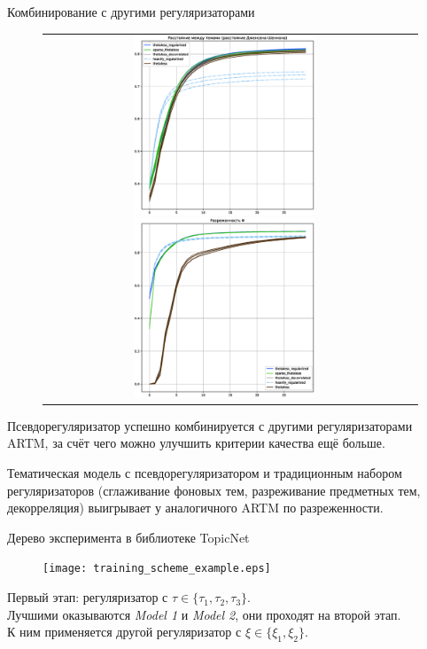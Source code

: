 \begin{frame}{Комбинирование с другими регуляризаторами}

\begin{figure}[t]
\setlength\tabcolsep{0pt} %
\begin{tabular}{cc}
\includegraphics[width=54mm]{images/CH4_improved_diversity_jensenshannon_False.eps}
\includegraphics[width=54mm]{images/CH4_improved_SparsityPhiScore.eps}& \end{tabular}
\end{figure}
Псевдорегуляризатор успешно комбинируется с другими регуляризаторами ARTM, за счёт чего можно улучшить критерии качества ещё больше. 

Тематическая модель с псевдорегуляризатором и традиционным набором регуляризаторов (сглаживание фоновых тем, разреживание предметных тем, декорреляция) выигрывает у аналогичного ARTM по разреженности.

\end{frame}

\begin{frame}{Дерево эксперимента в библиотеке TopicNet}

\begin{figure}[ht]
    \centering
    \texttt{[image: training\_scheme\_example.eps]}
\end{figure} 
        Первый этап: регуляризатор с $\tau \in \{\tau_1, \tau_2, \tau_3\}$.\\
        Лучшими оказываются \emph{Model 1} и \emph{Model 2}, они проходят на второй этап.\\
        К ним применяется другой регуляризатор с $\xi \in \{\xi_1, \xi_2\}$.
\end{frame}

